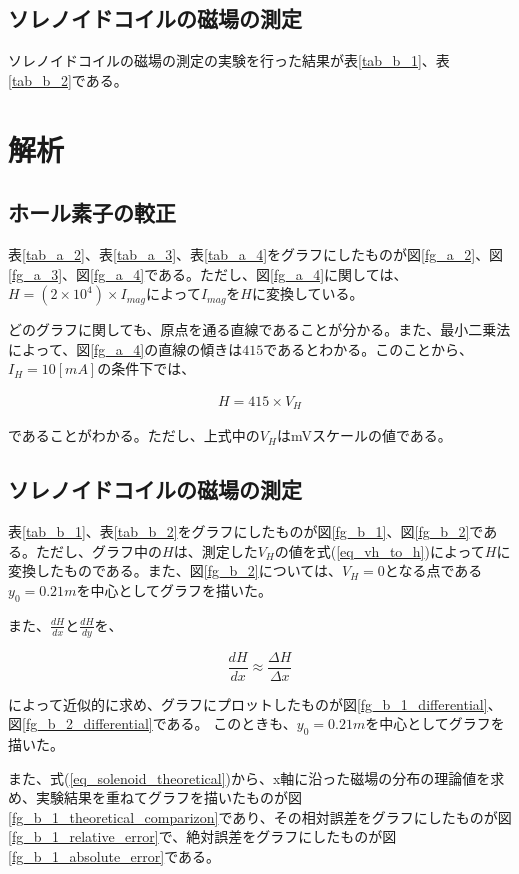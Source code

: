 \documentclass[uplatex,11pt]{jsarticle}
\newcommand{\fr}[1]{図\ref{fg_#1}}
\newcommand{\tr}[1]{表\ref{tab_#1}}
\newcommand{\er}[1]{式(\ref{#1})}
\begin{document}
\subsection{ソレノイドコイルの磁場の測定}

ソレノイドコイルの磁場の測定の実験を行った結果が\tr{b_1}、\tr{b_2}である。

\section{解析}
\subsection{ホール素子の較正}

\tr{a_2}、\tr{a_3}、\tr{a_4}をグラフにしたものが\fr{a_2}、\fr{a_3}、\fr{a_4}である。ただし、\fr{a_4}に関しては、$H = (2 \times 10^4) \times I_{mag}$によって$I_{mag}$を$H$に変換している。

どのグラフに関しても、原点を通る直線であることが分かる。また、最小二乗法によって、\fr{a_4}の直線の傾きは$415$であるとわかる。このことから、$I_H = 10[mA]$の条件下では、

\begin{eqnarray}
    H = 415 \times V_H \label{eq_vh_to_h}
\end{eqnarray}

であることがわかる。ただし、上式中の$V_H$はmVスケールの値である。

\subsection{ソレノイドコイルの磁場の測定}

\tr{b_1}、\tr{b_2}をグラフにしたものが\fr{b_1}、\fr{b_2}である。ただし、グラフ中の$H$は、測定した$V_H$の値を\er{eq_vh_to_h}によって$H$に変換したものである。また、\fr{b_2}については、$V_H = 0$となる点である$y_0=0.21m$を中心としてグラフを描いた。

また、$ \frac{dH}{dx} $と$ \frac{dH}{dy} $を、

\[
    \frac{dH}{dx} \approx \frac{\Delta H}{ \Delta x }
\]

によって近似的に求め、グラフにプロットしたものが\fr{b_1_differential}、\fr{b_2_differential}である。
このときも、$y_0=0.21m$を中心としてグラフを描いた。

また、\er{eq_solenoid_theoretical}から、x軸に沿った磁場の分布の理論値を求め、実験結果を重ねてグラフを描いたものが\fr{b_1_theoretical_comparizon}であり、その相対誤差をグラフにしたものが\fr{b_1_relative_error}で、絶対誤差をグラフにしたものが\fr{b_1_absolute_error}である。
\end{document}
